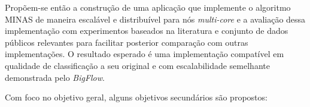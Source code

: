 % 

Propõem-se então a construção de uma aplicação que implemente o algoritmo MINAS
de maneira escalável e distribuível para nós \emph{multi-core} e a avaliação
dessa implementação com experimentos baseados na literatura e conjunto de dados
públicos relevantes para facilitar posterior comparação com outras
implementações. O resultado esperado é uma implementação compatível em qualidade de
classificação a seu original e com escalabilidade semelhante demonstrada pelo
\emph{BigFlow}.



Com foco no objetivo geral, alguns objetivos secundários são propostos:


